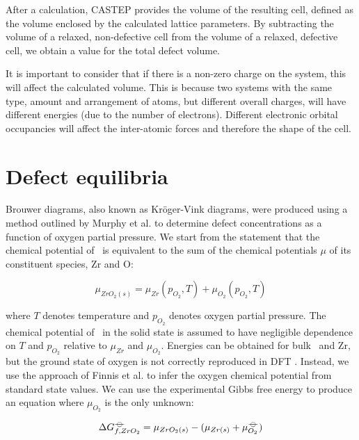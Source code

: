 After a calculation, CASTEP provides the volume of the resulting cell, defined as the volume enclosed by the calculated lattice parameters. By subtracting the volume of a relaxed, non-defective cell from the volume of a relaxed, defective cell, we obtain a value for the total defect volume. %

It is important to consider that if there is a non-zero charge on the system, this will affect the calculated volume. This is because two systems with the same type, amount and arrangement of atoms, but different overall charges, will have different energies (due to the number of electrons). Different electronic orbital occupancies will affect the inter-atomic forces and therefore the shape of the cell. 

\section{Defect equilibria}

Brouwer diagrams, also known as Kr{\"o}ger-Vink diagrams, were produced using a method outlined by Murphy et al. \cite{Murphy2014} to determine defect concentrations as a function of oxygen partial pressure. We start from the statement that the chemical potential of \zirconia\ is equivalent to the sum of the chemical potentials $\mu$ of its constituent species, Zr and O:

\begin{equation}
{\mu}_{ZrO_2(s)} = {\mu}_{Zr}(p_{O_2}, T) + {\mu}_{O_2}(p_{O_2}, T)
\label{mewZrO2compmethodology}
\end{equation}

where $T$ denotes temperature and $p_{O_2}$ denotes oxygen partial pressure. The chemical potential of \zirconia\ in the solid state is assumed to have negligible dependence on $T$ and $p_{O_2}$ relative to ${\mu}_{Zr}$ and ${\mu}_{O_2}$. Energies can be obtained for bulk \zirconia\ and Zr, but the ground state of oxygen is not correctly reproduced in DFT \cite{Batyrev2000,Lozovoi2001}. Instead, we use the approach of Finnis et al. \cite{Finnis2005} to infer the oxygen chemical potential from standard state values. We can use the experimental Gibbs free energy to produce an equation where $\mu_{O_2}$ is the only unknown:

\begin{equation}
\Delta{G^{{\ensuremath{-\kern-4pt{\ominus}\kern-4pt-}}}_{f, ZrO_2}} = \mu_{ZrO_2(s)} - (\mu_{Zr(s)} + \mu^{{-\kern-4pt{\ominus}\kern-4pt-}}_{O_2})
\end{equation}

